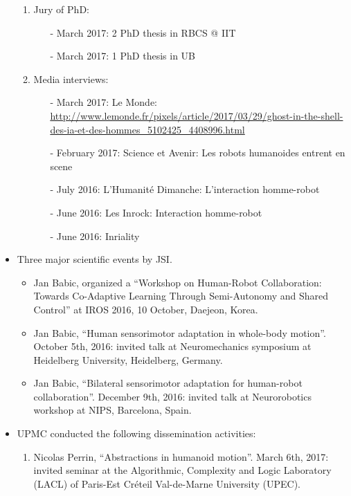 \begin{itemize}
\begin{enumerate}
\item Jury of PhD:

  \begin{itemize}
\item[-] March 2017: 2 PhD thesis in RBCS @ IIT
\item[-] March 2017: 1 PhD thesis in UB
  \end{itemize}

\item Media interviews:
  \begin{itemize}
\item[-] March 2017: Le Monde: \url{http://www.lemonde.fr/pixels/article/2017/03/29/ghost-in-the-shell-des-ia-et-des-hommes_5102425_4408996.html}
\item[-] February 2017: Science et Avenir: Les robots humanoides entrent en scene
\item[-] July 2016: L'Humanité Dimanche: L'interaction homme-robot
\item[-] June 2016: Les Inrock: Interaction homme-robot
\item[-] June 2016: Inriality
  \end{itemize}

  \end{enumerate}
  
 \item Three major scientific events by JSI.
 
  \begin{itemize}
   \item  Jan Babic, organized a ``Workshop on Human-Robot Collaboration: Towards Co-Adaptive Learning 
 Through Semi-Autonomy and Shared Control'' at IROS 2016, 10 October, Daejeon, Korea. 
   
 \item Jan Babic, ``Human sensorimotor adaptation in whole-body motion''. October 5th, 2016: invited talk at Neuromechanics symposium at Heidelberg University, Heidelberg, Germany.

\item Jan Babic, ``Bilateral sensorimotor adaptation for human-robot collaboration''. December 9th, 2016: invited talk at Neurorobotics workshop at NIPS, Barcelona, Spain.
   \end{itemize}
   
 \item UPMC conducted the following dissemination activities:
 
 \begin{enumerate}
 \item Nicolas Perrin, ``Abstractions in humanoid motion''. March 6th, 2017: invited seminar at the Algorithmic, Complexity and Logic Laboratory (LACL) of Paris-Est Créteil Val-de-Marne University (UPEC).


\end{enumerate}
\end{itemize}
